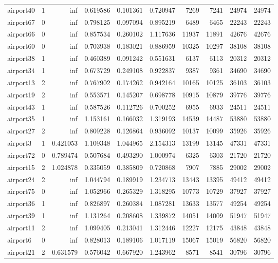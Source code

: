\begin{longtable}{|l|r|r|r|r|r|r|r|r|r|}
airport40 & 1 & inf & 0.619586 & 0.101361 & 0.720947 & 7269 & 7241 & 24974 & 24974 \\
airport67 & 0 & inf & 0.798125 & 0.097094 & 0.895219 & 6489 & 6465 & 22243 & 22243 \\
airport66 & 0 & inf & 0.857534 & 0.260102 & 1.117636 & 11937 & 11891 & 42676 & 42676 \\
airport60 & 0 & inf & 0.703938 & 0.183021 & 0.886959 & 10325 & 10297 & 38108 & 38108 \\
airport38 & 1 & inf & 0.460389 & 0.091242 & 0.551631 & 6137 & 6113 & 20312 & 20312 \\
airport34 & 1 & inf & 0.673729 & 0.249108 & 0.922837 & 9387 & 9361 & 34690 & 34690 \\
airport13 & 2 & inf & 0.767902 & 0.174262 & 0.942164 & 10165 & 10125 & 36103 & 36103 \\
airport19 & 2 & inf & 0.553571 & 0.145207 & 0.698778 & 10915 & 10879 & 39776 & 39776 \\
airport43 & 1 & inf & 0.587526 & 0.112726 & 0.700252 & 6955 & 6933 & 24511 & 24511 \\
airport35 & 1 & inf & 1.153161 & 0.166032 & 1.319193 & 14539 & 14487 & 53880 & 53880 \\
airport27 & 2 & inf & 0.809228 & 0.126864 & 0.936092 & 10137 & 10099 & 35926 & 35926 \\
airport3 & 1 & 0.421053 & 1.109348 & 1.044965 & 2.154313 & 13199 & 13145 & 47331 & 47331 \\
airport72 & 0 & 0.789474 & 0.507684 & 0.493290 & 1.000974 & 6325 & 6303 & 21720 & 21720 \\
airport15 & 2 & 1.024878 & 0.335059 & 0.385809 & 0.720868 & 7907 & 7885 & 29002 & 29002 \\
airport24 & 2 & inf & 1.044794 & 0.189919 & 1.234713 & 13443 & 13395 & 49412 & 49412 \\
airport75 & 0 & inf & 1.052966 & 0.265329 & 1.318295 & 10773 & 10729 & 37927 & 37927 \\
airport36 & 1 & inf & 0.826897 & 0.260384 & 1.087281 & 13633 & 13577 & 49254 & 49254 \\
airport39 & 1 & inf & 1.131264 & 0.208608 & 1.339872 & 14051 & 14009 & 51947 & 51947 \\
airport11 & 2 & inf & 1.099405 & 0.213041 & 1.312446 & 12227 & 12175 & 43848 & 43848 \\
airport6 & 0 & inf & 0.828013 & 0.189106 & 1.017119 & 15067 & 15019 & 56820 & 56820 \\
airport21 & 2 & 0.631579 & 0.576042 & 0.667920 & 1.243962 & 8571 & 8541 & 30796 & 30796 \\

\end{longtable}
